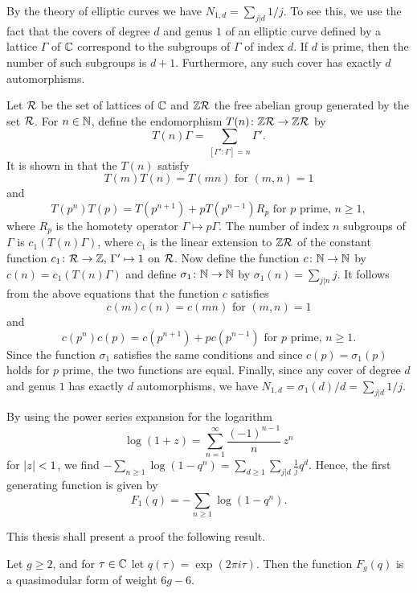 \begin{expl} \label{ex:genus-one}
 By the theory of elliptic curves we have $N_{1,d}=\sum_{j|d}1/j$. To see this, we use the fact that the covers of degree $d$ and genus $1$ of an elliptic curve defined by a lattice $\Gamma$ of $\mathbb{C}$ correspond to the subgroups of $\Gamma$ of index $d$. If $d$ is prime, then the number of such subgroups is $d+1$. Furthermore, any such cover has exactly $d$ automorphisms.
 
 Let $\mathcal{R}$ be the set of lattices of $\mathbb{C}$ and $\mathbb{Z}\mathcal{R}$ the free abelian group generated by the set $\mathcal{R}$. For $n\in\mathbb{N}$, define the endomorphism $T(n)\colon\mathbb{Z}\mathcal{R}\to\mathbb{Z}\mathcal{R}$ by
 \[
  T(n)\Gamma=\sum_{[\Gamma':\Gamma] = n}\Gamma'.
 \]
 It is shown in \cite[Ch.\ VII, Prop.\ 10]{Serre1973} that the $T(n)$ satisfy 
 \[T(m)T(n)=T(mn) \text{ for } (m,n)=1 \]
 and
 \[T(p^n)T(p)=T(p^{n+1})+pT(p^{n-1})R_p \text{ for } p \text{ prime, } n\geq1,\]
 where $R_p$ is the homotety operator $\Gamma\mapsto p\Gamma$. The number of index $n$ subgroups of $\Gamma$ is $c_1(T(n)\Gamma)$, where $c_1$ is the linear extension to $\mathbb{Z}\mathcal{R}$ of the constant function $c_1\colon\mathcal{R}\to\mathbb{Z},\, \Gamma'\mapsto 1$ on $\mathcal{R}$. Now define the function $c\colon \mathbb{N}\to\mathbb{N}$ by $c(n)=c_1(T(n)\Gamma)$ and define $\sigma_1\colon\mathbb{N}\to\mathbb{N}$ by $\sigma_1(n)=\sum_{j|n}j$. It follows from the above equations that the function $c$ satisfies \[c(m)c(n)=c(mn) \text{ for } (m,n)=1 \]
 and
 \[c(p^n)c(p)=c(p^{n+1})+pc(p^{n-1}) \text{ for } p \text{ prime, } n\geq1.\]
 Since the function $\sigma_1$ satisfies the same conditions and since $c(p)=\sigma_1(p)$ holds for $p$ prime, the two functions are equal. Finally, since any cover of degree $d$ and genus $1$ has exactly $d$ automorphisms, we have $N_{1,d}=\sigma_1(d)/d=\sum_{j|d}1/j$.
 
 By using the power series expansion for the logarithm \[\log(1+z)=\sum_{n=1}^{\infty}\frac{(-1)^{n-1}}{n}\,z^n\] for $|z|<1$, we find $-\sum_{n\geq 1}\log(1-q^n)=\sum_{d\geq 1}\sum_{j|d}\frac{1}{j}q^d.$
 Hence, the first generating function is given by \[F_1(q)=-\sum_{n\geq 1}\log(1-q^n).\]
\end{expl}

This thesis shall present a proof  the following result.

\begin{thm}
 Let $g\geq 2$, and for $\tau\in\mathbb{C}$ let $q(\tau)=\exp(2\pi i\tau)$. Then the function $F_g(q)$ is a quasimodular form of weight $6g-6$.
\end{thm}

